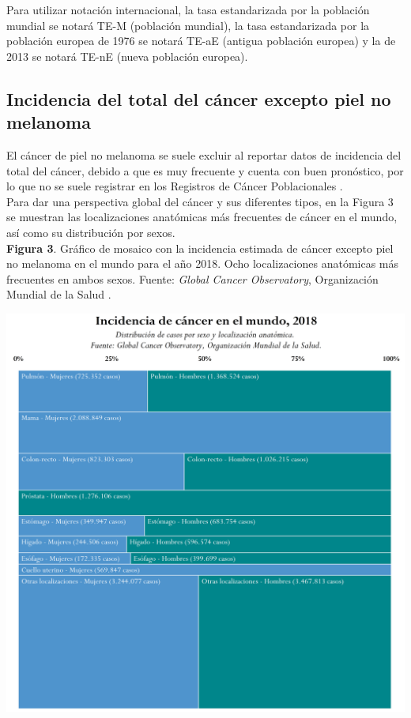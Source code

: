 Para utilizar notación internacional, la tasa estandarizada por la población mundial se notará TE-M (población mundial), la tasa estandarizada por la población europea de 1976 se notará TE-aE (antigua población europea) y la de 2013 se notará TE-nE (nueva población europea).

\subsection{Incidencia del total del cáncer excepto piel no melanoma}

El cáncer de piel no melanoma se suele excluir al reportar datos de incidencia del total del cáncer, debido a que es muy frecuente y cuenta con buen pronóstico, por lo que no se suele registrar en los Registros de Cáncer Poblacionales \cite{Gordon2013, Madan2010}.\\

Para dar una perspectiva global del cáncer y sus diferentes tipos, en la Figura 3 se muestran las localizaciones anatómicas más frecuentes de cáncer en el mundo, así como su distribución por sexos.\\

\textbf{Figura 3}. Gráfico de mosaico con la incidencia estimada de cáncer excepto piel no melanoma en el mundo para el año 2018. Ocho localizaciones anatómicas más frecuentes en ambos sexos. Fuente: \textit{Global Cancer Observatory}, Organización Mundial de la Salud \cite{GCO}.
\begin{center}
	\includegraphics[width=1\textwidth]{figuras/marimekko_gco_incidencia.png} \\
\end{center}

